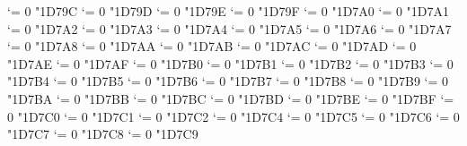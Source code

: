 {  \Umathcode `\Ν = 0 \unimathfam "1D79C
  \Umathcode `\Ξ = 0 \unimathfam "1D79D
  \Umathcode `\Ο = 0 \unimathfam "1D79E
  \Umathcode `\Π = 0 \unimathfam "1D79F
  \Umathcode `\Ρ = 0 \unimathfam "1D7A0
  \Umathcode `\ϴ = 0 \unimathfam "1D7A1
  \Umathcode `\Σ = 0 \unimathfam "1D7A2
  \Umathcode `\Τ = 0 \unimathfam "1D7A3
  \Umathcode `\Υ = 0 \unimathfam "1D7A4
  \Umathcode `\Φ = 0 \unimathfam "1D7A5
  \Umathcode `\Χ = 0 \unimathfam "1D7A6
  \Umathcode `\Ψ = 0 \unimathfam "1D7A7
  \Umathcode `\Ω = 0 \unimathfam "1D7A8
  \Umathcode `\α = 0 \unimathfam "1D7AA
  \Umathcode `\β = 0 \unimathfam "1D7AB
  \Umathcode `\γ = 0 \unimathfam "1D7AC
  \Umathcode `\δ = 0 \unimathfam "1D7AD
  \Umathcode `\ε = 0 \unimathfam "1D7AE
  \Umathcode `\ζ = 0 \unimathfam "1D7AF
  \Umathcode `\η = 0 \unimathfam "1D7B0
  \Umathcode `\θ = 0 \unimathfam "1D7B1
  \Umathcode `\ι = 0 \unimathfam "1D7B2
  \Umathcode `\κ = 0 \unimathfam "1D7B3
  \Umathcode `\λ = 0 \unimathfam "1D7B4
  \Umathcode `\μ = 0 \unimathfam "1D7B5
  \Umathcode `\ν = 0 \unimathfam "1D7B6
  \Umathcode `\ξ = 0 \unimathfam "1D7B7
  \Umathcode `\ο = 0 \unimathfam "1D7B8
  \Umathcode `\π = 0 \unimathfam "1D7B9
  \Umathcode `\ρ = 0 \unimathfam "1D7BA
  \Umathcode `\ς = 0 \unimathfam "1D7BB
  \Umathcode `\σ = 0 \unimathfam "1D7BC
  \Umathcode `\τ = 0 \unimathfam "1D7BD
  \Umathcode `\υ = 0 \unimathfam "1D7BE
  \Umathcode `\ϕ = 0 \unimathfam "1D7BF
  \Umathcode `\χ = 0 \unimathfam "1D7C0
  \Umathcode `\ψ = 0 \unimathfam "1D7C1
  \Umathcode `\ω = 0 \unimathfam "1D7C2
  \Umathcode `\ϵ = 0 \unimathfam "1D7C4
  \Umathcode `\ϑ = 0 \unimathfam "1D7C5
  \Umathcode `\ϰ = 0 \unimathfam "1D7C6
  \Umathcode `\φ = 0 \unimathfam "1D7C7
  \Umathcode `\ϱ = 0 \unimathfam "1D7C8
  \Umathcode `\ϖ = 0 \unimathfam "1D7C9
\fi
\tensfbfit}
\let\sfitbf=\sfbfit
\let\bfsfit=\sfbfit
\let\bfitsf=\sfbfit
\let\itsfbf=\sfbfit
\let\itbfsf=\sfbfit

